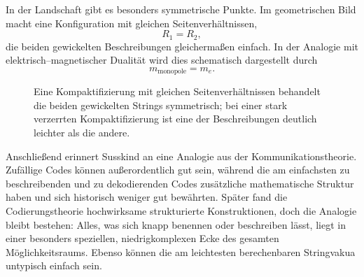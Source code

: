 In der Landschaft gibt es besonders symmetrische Punkte. Im geometrischen Bild macht eine Konfiguration mit gleichen Seitenverhältnissen,
\begin{equation}
R_1=R_2,
\end{equation}
die beiden gewickelten Beschreibungen gleichermaßen einfach. In der Analogie mit elektrisch--magnetischer Dualität wird dies schematisch dargestellt durch
\begin{equation}
m_{\mathrm{monopole}}=m_e.
\end{equation}

\begin{figure}[htbp]
\centering
{}
\caption{Eine Kompaktifizierung mit gleichen Seitenverhältnissen behandelt die beiden gewickelten Strings symmetrisch; bei einer stark verzerrten Kompaktifizierung ist eine der Beschreibungen deutlich leichter als die andere.}
\end{figure}

\begin{classroomqa}
\end{classroomqa}


Anschließend erinnert Susskind an eine Analogie aus der Kommunikationstheorie. Zufällige Codes können außerordentlich gut sein, während die am einfachsten zu beschreibenden und zu dekodierenden Codes zusätzliche mathematische Struktur haben und sich historisch weniger gut bewährten. Später fand die Codierungstheorie hochwirksame strukturierte Konstruktionen, doch die Analogie bleibt bestehen: Alles, was sich knapp benennen oder beschreiben lässt, liegt in einer besonders speziellen, niedrigkomplexen Ecke des gesamten Möglichkeitsraums. Ebenso können die am leichtesten berechenbaren Stringvakua untypisch einfach sein.

